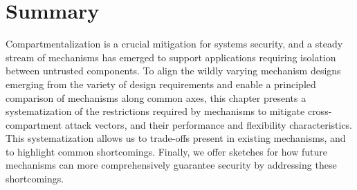 \section{Summary}
\label{sec:compsok:conclusion}
Compartmentalization is a crucial mitigation for systems security, and a steady
stream of mechanisms has emerged to support applications requiring isolation
between untrusted components.
To align the wildly varying mechanism designs emerging from the variety of
design requirements and enable a principled comparison of mechanisms along 
common axes, this chapter presents a systematization of the restrictions required
by mechanisms to mitigate cross-compartment attack vectors, and their performance
and flexibility characteristics.
This systematization allows us to trade-offs present in existing mechanisms,
and to highlight common shortcomings.
Finally, we offer sketches for how future mechanisms can more comprehensively
guarantee security by addressing these shortcomings.
